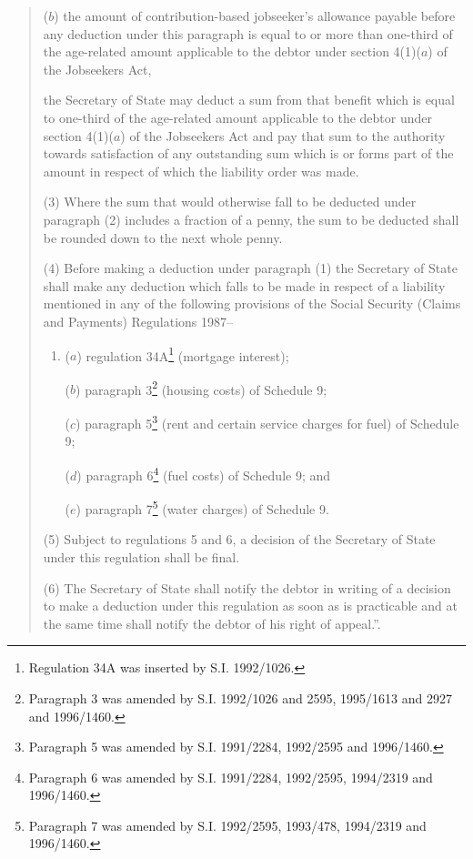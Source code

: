 \documentclass[12pt,a4paper]{article}
\begin{document}
\begin{quotation}
\begin{enumerate}
($b$) the amount of contribution-based jobseeker’s allowance payable before any deduction under this paragraph is equal to or more than one-third of the age-related amount applicable to the debtor under section 4(1)($a$)  of the Jobseekers Act,
\end{enumerate}
the Secretary of State may deduct a sum from that benefit which is equal to one-third of the age-related amount applicable to the debtor under section 4(1)($a$)  of the Jobseekers Act and pay that sum to the authority towards satisfaction of any outstanding sum which is or forms part of the amount in respect of which the liability order was made.

(3) Where the sum that would otherwise fall to be deducted under paragraph (2) includes a fraction of a penny, the sum to be deducted shall be rounded down to the next whole penny.

(4) Before making a deduction under paragraph (1) the Secretary of State shall make any deduction which falls to be made in respect of a liability mentioned in any of the following provisions of the Social Security (Claims and Payments) Regulations 1987–
\begin{enumerate}\item[]
($a$) regulation 34A\footnote{\frenchspacing Regulation 34A was inserted by S.I. 1992/1026.} (mortgage interest);

($b$) paragraph 3\footnote{\frenchspacing Paragraph 3 was amended by S.I. 1992/1026 and 2595, 1995/1613 and 2927 and 1996/1460.} (housing costs) of Schedule 9;

($c$) paragraph 5\footnote{\frenchspacing Paragraph 5 was amended by S.I. 1991/2284, 1992/2595 and 1996/1460.} (rent and certain service charges for fuel) of Schedule 9;

($d$) paragraph 6\footnote{\frenchspacing Paragraph 6 was amended by S.I. 1991/2284, 1992/2595, 1994/2319 and 1996/1460.} (fuel costs) of Schedule 9; and

($e$) paragraph 7\footnote{\frenchspacing Paragraph 7 was amended by S.I. 1992/2595, 1993/478, 1994/2319 and 1996/1460.} (water charges) of Schedule 9.
\end{enumerate}

(5) Subject to regulations 5 and 6, a decision of the Secretary of State under this regulation shall be final.

(6) The Secretary of State shall notify the debtor in writing of a decision to make a deduction under this regulation as soon as is practicable and at the same time shall notify the debtor of his right of appeal.”.
\end{quotation}
\end{document}
